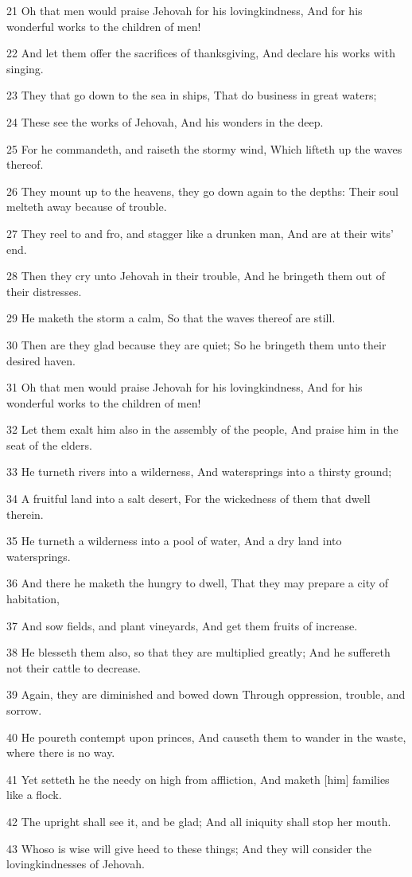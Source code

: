 \par 21 Oh that men would praise Jehovah for his lovingkindness, And for his wonderful works to the children of men!
\par 22 And let them offer the sacrifices of thanksgiving, And declare his works with singing.
\par 23 They that go down to the sea in ships, That do business in great waters;
\par 24 These see the works of Jehovah, And his wonders in the deep.
\par 25 For he commandeth, and raiseth the stormy wind, Which lifteth up the waves thereof.
\par 26 They mount up to the heavens, they go down again to the depths: Their soul melteth away because of trouble.
\par 27 They reel to and fro, and stagger like a drunken man, And are at their wits' end.
\par 28 Then they cry unto Jehovah in their trouble, And he bringeth them out of their distresses.
\par 29 He maketh the storm a calm, So that the waves thereof are still.
\par 30 Then are they glad because they are quiet; So he bringeth them unto their desired haven.
\par 31 Oh that men would praise Jehovah for his lovingkindness, And for his wonderful works to the children of men!
\par 32 Let them exalt him also in the assembly of the people, And praise him in the seat of the elders.
\par 33 He turneth rivers into a wilderness, And watersprings into a thirsty ground;
\par 34 A fruitful land into a salt desert, For the wickedness of them that dwell therein.
\par 35 He turneth a wilderness into a pool of water, And a dry land into watersprings.
\par 36 And there he maketh the hungry to dwell, That they may prepare a city of habitation,
\par 37 And sow fields, and plant vineyards, And get them fruits of increase.
\par 38 He blesseth them also, so that they are multiplied greatly; And he suffereth not their cattle to decrease.
\par 39 Again, they are diminished and bowed down Through oppression, trouble, and sorrow.
\par 40 He poureth contempt upon princes, And causeth them to wander in the waste, where there is no way.
\par 41 Yet setteth he the needy on high from affliction, And maketh [him] families like a flock.
\par 42 The upright shall see it, and be glad; And all iniquity shall stop her mouth.
\par 43 Whoso is wise will give heed to these things; And they will consider the lovingkindnesses of Jehovah.

